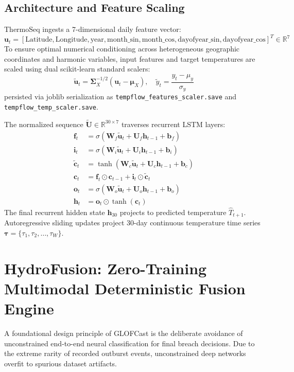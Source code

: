 \documentclass{mnnit}
\begin{document}
\subsection{Architecture and Feature Scaling}
ThermoSeq ingests a 7-dimensional daily feature vector:
\begin{equation}
    \mathbf{u}_t = \left[\text{Latitude}, \text{Longitude}, \text{year}, \text{month\_sin}, \text{month\_cos}, \text{dayofyear\_sin}, \text{dayofyear\_cos}\right]^T \in \mathbb{R}^7
\end{equation}
To ensure optimal numerical conditioning across heterogeneous geographic coordinates and harmonic variables, input features and target temperatures are scaled using dual scikit-learn standard scalers:
\begin{equation}
    \tilde{\mathbf{u}}_t = \mathbf{\Sigma}_X^{-1/2} (\mathbf{u}_t - \mathbf{\mu}_X), \quad \tilde{y}_t = \frac{y_t - \mu_y}{\sigma_y}
\end{equation}
persisted via joblib serialization as \texttt{tempflow\_features\_scaler.save} and \texttt{tempflow\_temp\_scaler.save}.

The normalized sequence $\tilde{\mathbf{U}} \in \mathbb{R}^{30 \times 7}$ traverses recurrent LSTM layers:
\begin{align}
    \mathbf{f}_t &= \sigma\left(\mathbf{W}_f \tilde{\mathbf{u}}_t + \mathbf{U}_f \mathbf{h}_{t-1} + \mathbf{b}_f\right) \\
    \mathbf{i}_t &= \sigma\left(\mathbf{W}_i \tilde{\mathbf{u}}_t + \mathbf{U}_i \mathbf{h}_{t-1} + \mathbf{b}_i\right) \\
    \tilde{\mathbf{c}}_t &= \tanh\left(\mathbf{W}_c \tilde{\mathbf{u}}_t + \mathbf{U}_c \mathbf{h}_{t-1} + \mathbf{b}_c\right) \\
    \mathbf{c}_t &= \mathbf{f}_t \odot \mathbf{c}_{t-1} + \mathbf{i}_t \odot \tilde{\mathbf{c}}_t \\
    \mathbf{o}_t &= \sigma\left(\mathbf{W}_o \tilde{\mathbf{u}}_t + \mathbf{U}_o \mathbf{h}_{t-1} + \mathbf{b}_o\right) \\
    \mathbf{h}_t &= \mathbf{o}_t \odot \tanh(\mathbf{c}_t)
\end{align}
The final recurrent hidden state $\mathbf{h}_{30}$ projects to predicted temperature $\hat{T}_{t+1}$. Autoregressive sliding updates project 30-day continuous temperature time series $\mathbf{\tau} = \{\tau_1, \tau_2, \dots, \tau_W\}$.

\section{HydroFusion: Zero-Training Multimodal Deterministic Fusion Engine}
A foundational design principle of GLOFCast is the deliberate avoidance of unconstrained end-to-end neural classification for final breach decisions. Due to the extreme rarity of recorded outburst events, unconstrained deep networks overfit to spurious dataset artifacts.
\end{document}
